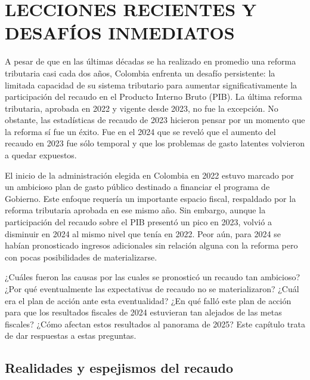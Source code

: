 \chapter{LECCIONES RECIENTES Y DESAF\'{I}OS INMEDIATOS}\label{chap:juego}


A pesar de que en las últimas décadas se ha realizado en promedio una reforma tributaria casi cada dos años, Colombia enfrenta un desafío persistente: la limitada capacidad de su sistema tributario para aumentar significativamente la participación del recaudo en el Producto Interno Bruto (PIB). La última reforma tributaria, aprobada en 2022 y vigente desde 2023, no fue la excepción. No obstante, las estadísticas de recaudo de 2023 hicieron pensar por un momento que la reforma sí fue un éxito. Fue en el 2024 que se reveló que el aumento del recaudo en 2023 fue sólo temporal y que los problemas de gasto latentes volvieron a quedar expuestos.

El inicio de la administración elegida en Colombia en 2022 estuvo marcado por un ambicioso plan de gasto público destinado a financiar el programa de Gobierno. Este enfoque requería un importante espacio fiscal, respaldado por la reforma tributaria aprobada en ese mismo año. Sin embargo, aunque la participación del recaudo sobre el PIB presentó un pico en 2023, volvió a disminuir en 2024 al mismo nivel que tenía en 2022. Peor aún, para 2024 se habían pronosticado ingresos adicionales sin relación alguna con la reforma pero con pocas posibilidades de materializarse. 

¿Cuáles fueron las causas por las cuales se pronosticó un recaudo tan ambicioso? ¿Por qué eventualmente las expectativas de recaudo no se materializaron? ¿Cuál era el plan de acción ante esta eventualidad? ¿En qué falló este plan de acción para que los resultados fiscales de 2024 estuvieran tan alejados de las metas fiscales? ¿Cómo afectan estos resultados al panorama de 2025? Este capítulo trata de dar respuestas a estas preguntas.

\section{Realidades y espejismos del recaudo}

